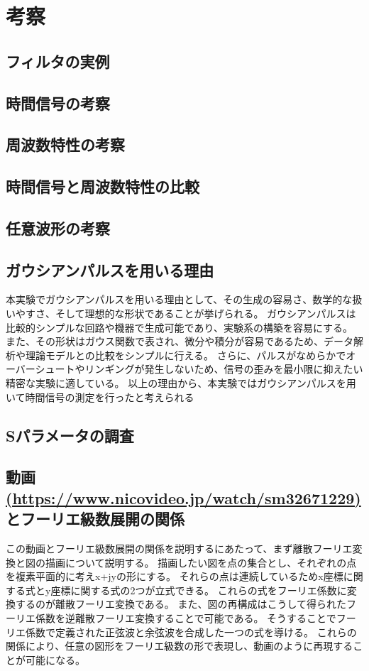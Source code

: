 \documentclass[11pt,dvipdfmx]{jarticle}
\begin{document}
\section{考察}
\subsection{フィルタの実例}

\subsection{時間信号の考察}

\subsection{周波数特性の考察}

\subsection{時間信号と周波数特性の比較}

\subsection{任意波形の考察}

\subsection{ガウシアンパルスを用いる理由}
本実験でガウシアンパルスを用いる理由として、その生成の容易さ、数学的な扱いやすさ、そして理想的な形状であることが挙げられる。
ガウシアンパルスは比較的シンプルな回路や機器で生成可能であり、実験系の構築を容易にする。
また、その形状はガウス関数で表され、微分や積分が容易であるため、データ解析や理論モデルとの比較をシンプルに行える。
さらに、パルスがなめらかでオーバーシュートやリンギングが発生しないため、信号の歪みを最小限に抑えたい精密な実験に適している。
以上の理由から、本実験ではガウシアンパルスを用いて時間信号の測定を行ったと考えられる
\subsection{Sパラメータの調査}

\subsection{動画\url{(https://www.nicovideo.jp/watch/sm32671229)}とフーリエ級数展開の関係}
この動画とフーリエ級数展開の関係を説明するにあたって、まず離散フーリエ変換と図の描画について説明する。
描画したい図を点の集合とし、それぞれの点を複素平面的に考えx+jyの形にする。
それらの点は連続しているためx座標に関する式とy座標に関する式の2つが立式できる。
これらの式をフーリエ係数に変換するのが離散フーリエ変換である。
また、図の再構成はこうして得られたフーリエ係数を逆離散フーリエ変換することで可能である。
そうすることでフーリエ係数で定義された正弦波と余弦波を合成した一つの式を導ける。
これらの関係により、任意の図形をフーリエ級数の形で表現し、動画のように再現することが可能になる。
\end{document}
